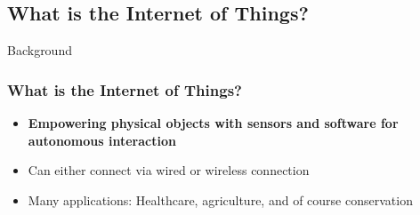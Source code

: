 \documentclass{beamer}
\begin{document}
\subsection{What is the Internet of Things?}

\begin{frame}{Background}
  \frametitle{What is the Internet of Things?}
  \begin{itemize}
    \item \textbf{Empowering physical objects with sensors and software for autonomous interaction}
    \item Can either connect via wired or wireless connection
    \item Many applications: Healthcare, agriculture, and of course conservation
  \end{itemize}
\end{frame}
\end{document}
